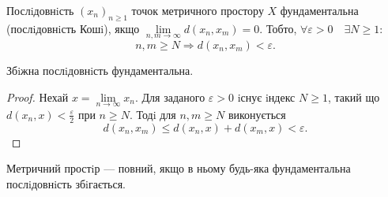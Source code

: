 \begin{definition}
    Послiдовнiсть $(x_n)_{n \geqslant 1}$ точок метричного простору $X$ фундаментальна
    (послiдовнiсть Кошi), якщо $\lim\limits_{n,m \rightarrow \infty} d(x_n, x_m) = 0$.
    Тобто, $\forall \varepsilon > 0 \quad \exists N \geqslant 1$:
    $$n, m \geqslant N \Rightarrow d(x_n, x_m) < \varepsilon.$$
\end{definition}

\begin{theorem}
    Збiжна послiдовнiсть фундаментальна.
\end{theorem}
\begin{proof}
    Нехай $x = \lim\limits_{n \rightarrow \infty} x_n$.
    Для заданого $\varepsilon > 0$ iснує iндекс $N \geqslant 1$,
    такий що $d(x_n, x) < \frac{\varepsilon}{2}$ при $n \geqslant N$.
    Тодi для $n, m \geqslant N$ виконується
    $$d(x_n, x_m) \leqslant d(x_n, x) + d(x_m, x) < \varepsilon.$$
\end{proof}


\begin{definition}
    Метричний простiр --- повний, якщо в ньому будь-яка фундаментальна
    послiдовнiсть збiгається.
\end{definition}


